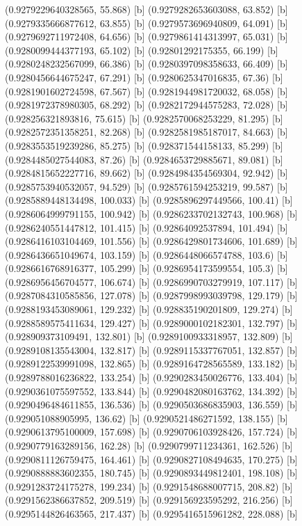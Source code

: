 {{{(0.9279229640328565, 55.868) [b] 
(0.9279282653603088, 63.852) [b] 
(0.9279335666877612, 63.855) [b] 
(0.9279573696940809, 64.091) [b] 
(0.9279692711972408, 64.656) [b] 
(0.9279861414313997, 65.031) [b] 
(0.9280099444377193, 65.102) [b] 
(0.92801292175355, 66.199) [b] 
(0.9280248232567099, 66.386) [b] 
(0.9280397098358633, 66.409) [b] 
(0.9280456644675247, 67.291) [b] 
(0.9280625347016835, 67.36) [b] 
(0.9281901602724598, 67.567) [b] 
(0.9281944981720032, 68.058) [b] 
(0.9281972378980305, 68.292) [b] 
(0.9282172944575283, 72.028) [b] 
(0.928256321893816, 75.615) [b] 
(0.9282570068253229, 81.295) [b] 
(0.9282572351358251, 82.268) [b] 
(0.9282581985187017, 84.663) [b] 
(0.9283553519239286, 85.275) [b] 
(0.928371544158133, 85.299) [b] 
(0.9284485027544083, 87.26) [b] 
(0.9284653729885671, 89.081) [b] 
(0.9284815652227716, 89.662) [b] 
(0.9284984354569304, 92.942) [b] 
(0.9285753940532057, 94.529) [b] 
(0.9285761594253219, 99.587) [b] 
(0.9285889448134498, 100.033) [b] 
(0.9285896297449566, 100.41) [b] 
(0.9286064999791155, 100.942) [b] 
(0.9286233702132743, 100.968) [b] 
(0.9286240551447812, 101.415) [b] 
(0.92864092537894, 101.494) [b] 
(0.9286416103104469, 101.556) [b] 
(0.9286429801734606, 101.689) [b] 
(0.9286436651049674, 103.159) [b] 
(0.9286448066574788, 103.6) [b] 
(0.9286616768916377, 105.299) [b] 
(0.9286954173599554, 105.3) [b] 
(0.9286956456704577, 106.674) [b] 
(0.9286990703279919, 107.117) [b] 
(0.9287084310585856, 127.078) [b] 
(0.9287998993039798, 129.179) [b] 
(0.9288193453089061, 129.232) [b] 
(0.928835190201809, 129.274) [b] 
(0.9288589575411634, 129.427) [b] 
(0.9289000102182301, 132.797) [b] 
(0.928909373109491, 132.801) [b] 
(0.9289100933318957, 132.809) [b] 
(0.9289108135543004, 132.817) [b] 
(0.9289115337767051, 132.857) [b] 
(0.9289122539991098, 132.865) [b] 
(0.9289164728565589, 133.182) [b] 
(0.9289788016236822, 133.254) [b] 
(0.9290283450026776, 133.404) [b] 
(0.9290361075597552, 133.844) [b] 
(0.9290482080163762, 134.392) [b] 
(0.9290496484611855, 136.536) [b] 
(0.9290503686835903, 136.559) [b] 
(0.929051088905995, 136.62) [b] 
(0.9290521486271592, 138.155) [b] 
(0.9290613795100009, 157.698) [b] 
(0.9290706103928426, 157.724) [b] 
(0.9290779163289156, 162.28) [b] 
(0.9290799711234361, 162.526) [b] 
(0.9290811126759475, 164.461) [b] 
(0.9290827108494635, 170.275) [b] 
(0.9290888883602355, 180.745) [b] 
(0.9290893449812401, 198.108) [b] 
(0.9291283724175278, 199.234) [b] 
(0.9291548688007715, 208.82) [b] 
(0.9291562386637852, 209.519) [b] 
(0.929156923595292, 216.256) [b] 
(0.9295144826463565, 217.437) [b] 
(0.9295416515961282, 228.088) [b] 
}}}
